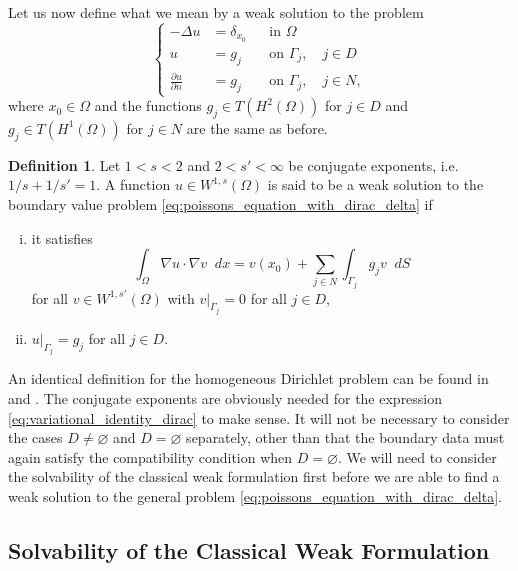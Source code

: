 \documentclass[english, 12pt, a4paper, sci, utf8, a-2b, online]{aaltothesis}
\theoremstyle{definition}
\newtheorem{definition}{Definition}[section]
\theoremstyle{plain}
\newcommand*\diff{\mathop{}\!d}
\numberwithin{equation}{section}
\begin{document}
Let us now define what we mean by a weak solution to the problem
\begin{equation}
    \label{eq:poissons_equation_with_dirac_delta}
    \left\{
        \begin{aligned}
            -\Delta u &= \delta_{x_0} && \text{in } \Omega \\
            u &= g_j && \text{on } \Gamma_j, \quad j \in D \\
            \frac{\partial u}{\partial n} &= g_j && \text{on } \Gamma_j,
            \quad j \in N,
        \end{aligned}
    \right.
\end{equation}
where $x_0 \in \Omega$ and the functions $g_j \in T(H^2(\Omega))$ for $j \in D$
and $g_j \in T(H^1(\Omega))$ for $j \in N$ are the same as before.
\begin{definition}
    \label{def:weak_solution_dirac}
    Let $1 < s < 2$ and $2 < s' < \infty$ be conjugate exponents,
    i.e.\ $1/s + 1/s' = 1$.
    A function $u \in W^{1,s}(\Omega)$ is said to be a weak solution to the
    boundary value problem \eqref{eq:poissons_equation_with_dirac_delta} if
    \begin{enumerate}[(i)]
        \item it satisfies
        \begin{equation}
            \label{eq:variational_identity_dirac}
            \int_{\Omega} \nabla u \cdot \nabla v \diff x
            = v(x_0) + \sum_{j \in N} \int_{\Gamma_j} g_j v \diff S
        \end{equation}
        for all $v \in W^{1,s'}(\Omega)$ with $v|_{\Gamma_j} = 0$
        for all $j \in D$,
        \item $u|_{\Gamma_j} = g_j$ for all $j \in D$.
    \end{enumerate}
\end{definition}
An identical definition for the homogeneous Dirichlet problem
can be found in \cite{casas1985} and \cite{arayabehrens2006}.
The conjugate exponents are obviously needed for the expression
\eqref{eq:variational_identity_dirac} to make sense.
It will not be necessary to consider the cases $D \neq \varnothing$
and $D = \varnothing$ separately, other than that the boundary data must again satisfy
the compatibility condition when $D = \varnothing$. We will need to consider
the solvability of the classical weak formulation first before we are able
to find a weak solution to the general problem \eqref{eq:poissons_equation_with_dirac_delta}.

\subsection{Solvability of the Classical Weak Formulation}
\label{subsec:solvability_of_the_classical_weak_formulation}
\end{document}
